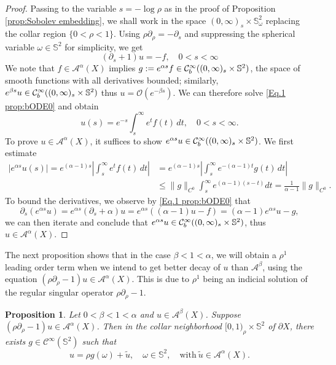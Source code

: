 \documentclass[10pt,a4paper,reqno]{amsart}
\newcommand{\CI}{\mathcal{C}^\infty}
\newcommand{\A}{\mathcal{A}}
\newcommand{\pa}{\partial}
\renewcommand{\S}{{\mathbb S}}
\newtheorem{proposition}[theorem]{Proposition}
\theoremstyle{definition}
\theoremstyle{remark}
\numberwithin{equation}{section}
\begin{document}
\begin{proof}
Passing to the variable $s=-\log\rho$ as in the proof of Proposition \ref{prop:Sobolev embedding}, we shall work in the space $(0,\infty)_s\times\S_\omega^2$ replacing the collar region $\{0<\rho<1\}$. Using $\rho\pa_\rho = -\pa_s$ and suppressing the spherical variable $\omega\in\S^2$ for simplicity, we get
\begin{equation}
\label{Eq.1 prop:bODE0}
    (\pa_s + 1) u = -f,\quad 0<s<\infty
\end{equation}
We note that $f\in \A^\alpha(X)$ implies $g:=e^{\alpha s}f\in\CI_{\rm b}((0,\infty)_s\times\S^2)$, the space of smooth functions with all derivatives bounded; similarly, $e^{\beta s}u\in \CI_{\rm b}((0,\infty)_s\times\S^2)$ thus $u=\mathcal{O}(e^{-\beta s})$. We can therefore solve \eqref{Eq.1 prop:bODE0} and obtain
\[
    u(s) = e^{-s} \int_s^\infty e^t f(t)\,dt,\quad 0<s<\infty.
\]
To prove $u\in\A^\alpha(X)$, it suffices to show $e^{\alpha s}u \in \CI_{\rm b}((0,\infty)_s\times\S^2)$. We first estimate
\[
\begin{split}
    |e^{\alpha s}u(s)| = e^{(\alpha-1)s} \left| \int_s^\infty e^t f(t)\,dt \right| &= e^{(\alpha-1)s} \left| \int_s^\infty e^{-(\alpha-1)t} g(t)\,dt \right| \\
    &\leq \|g\|_{C^0} \int_s^\infty e^{(\alpha-1)(s-t)} dt = \frac{1}{\alpha-1}\|g\|_{C^0}.
\end{split}
\]
To bound the derivatives, we observe by \eqref{Eq.1 prop:bODE0} that
\[
    \pa_s(e^{\alpha s}u) = e^{\alpha s} (\pa_s +\alpha) u = e^{\alpha s} ((\alpha-1)u - f) = (\alpha-1)e^{\alpha s}u - g,
\]
we can then iterate and conclude that $e^{\alpha s}u \in \CI_{\rm b}((0,\infty)_s\times\S^2)$, thus $u\in\A^\alpha(X)$.
\end{proof}

The next proposition shows that in the case $\beta<1<\alpha$, we will obtain a $\rho^1$ leading order term when we intend to get better decay of $u$ than $\A^\beta$, using the equation $(\rho\pa_\rho - 1)u\in\A^\alpha(X)$. This is due to $\rho^1$ being an indicial solution of the regular singular operator $\rho\pa_\rho - 1$.  

\begin{proposition}
\label{prop:bODEconormal}
Let $0<\beta<1<\alpha$ and $u\in\A^\beta(X)$. Suppose $(\rho\pa_\rho - 1) u\in \A^{\alpha}(X)$. Then in the collar neighborhood $[0,1)_\rho\times\S^2$ of $\partial X$, there exists $g\in\CI(\S^2)$ such that
\[
    u = \rho g(\omega) + \widetilde{u},\quad \omega\in\S^2,\quad\text{with}\ \widetilde{u}\in \A^{\alpha}(X).
\]
\end{proposition}
\end{document}
